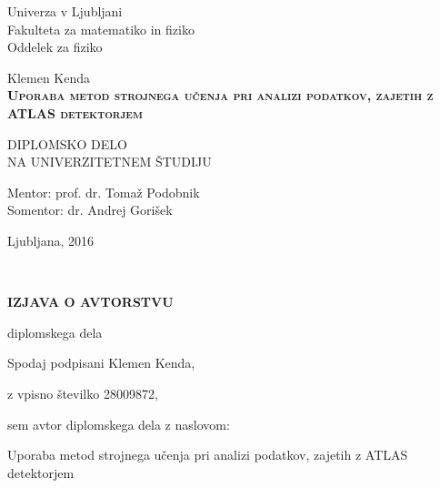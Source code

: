 \thispagestyle{empty} 

\begin{center}
{\large 
Univerza v Ljubljani\\
Fakulteta za matematiko in fiziko\\
Oddelek za fiziko
}

\vspace{3cm}
{\LARGE Klemen Kenda}\\

\vspace{2cm}
\textsc{\textbf{
\LARGE 
Uporaba metod strojnega učenja pri analizi podatkov, zajetih z ATLAS detektorjem }}

\vspace{2cm}
{ DIPLOMSKO DELO}\\
{ NA UNIVERZITETNEM ŠTUDIJU\\}

\vspace{2cm} 
{\Large Mentor: prof. dr. Tomaž Podobnik} \\
{\Large Somentor: dr. Andrej Gorišek}

\vfill
{\Large Ljubljana, 2016}
\end{center}

\newpage

\ \thispagestyle{empty}
\newpage

\thispagestyle{empty}

\vspace{1cm}
\begin{center} 
{\Large \textbf{IZJAVA O AVTORSTVU}}
\end{center}

\begin{center} 
{\Large diplomskega dela}
\end{center}

\vspace{1cm}
Spodaj podpisani \hspace{0.5cm} Klemen Kenda,

\vspace{0.5cm}
z vpisno številko \hspace{0.65cm} 28009872,

\vspace{1cm}
sem avtor diplomskega dela z naslovom:
   
\vspace{0.5cm}
Uporaba metod strojnega učenja pri analizi podatkov, zajetih z ATLAS detektorjem

